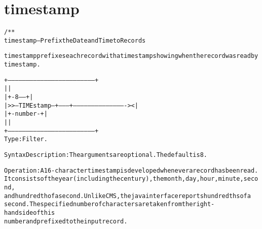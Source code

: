 \section{timestamp}
\begin{shaded}
\begin{alltt}
/**
timestamp--Prefix the Date and Time to Records

timestamp  prefixes  each  record with a timestamp showing when the record was read by timestamp.

+------------------------------------------------------------------------+
|                                                                        |
|                +-8------+                                              |
| >>--TIMEstamp--+--------+------------------------------------------->< |
|                +-number-+                                              |
|                                                                        |
+------------------------------------------------------------------------+
Type:  Filter.


Syntax Description:  The arguments are optional.  The default is 8.


Operation:  A 16-character timestamp is developed whenever  a  record  has been  read.
It consists of the year (including the century), the month, day, hour, minute, second,
and hundredth  of  a  second.  Unlike CMS, the java interface reports hundredths of a
second.  The  specified number of characters are taken from the right-hand side of this
number and prefixed to the input record.
\end{alltt}
\end{shaded}
